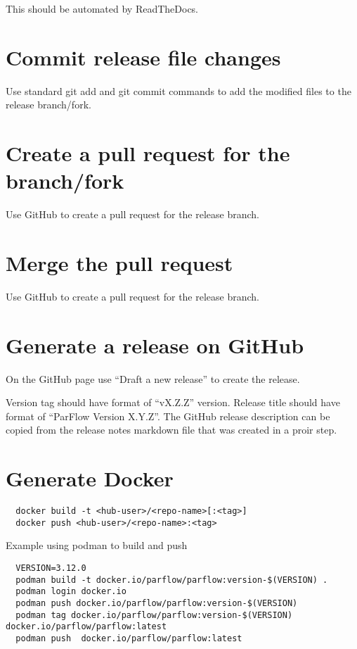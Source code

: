 This should be automated by ReadTheDocs.
  
\section{Commit release file changes}

Use standard git add and git commit commands to add the modified files
to the release branch/fork.

\section{Create a pull request for the branch/fork}

Use GitHub to create a pull request for the release branch.
  
\section{Merge the pull request}

Use GitHub to create a pull request for the release branch.
  
\section{Generate a release on GitHub}

On the GitHub  page use
``Draft a new release'' to create the release.

Version tag should have format of ``vX.Z.Z'' version.  Release title
should have format of ``ParFlow Version X.Y.Z''.  The GitHub release
description can be copied from the release notes markdown file that
was created in a proir step.

\section{Generate Docker}

\begin{display}\begin{verbatim}
  docker build -t <hub-user>/<repo-name>[:<tag>]
  docker push <hub-user>/<repo-name>:<tag>
\end{verbatim}\end{display}

Example using podman to build and push

\begin{display}\begin{verbatim}
  VERSION=3.12.0
  podman build -t docker.io/parflow/parflow:version-$(VERSION) .
  podman login docker.io
  podman push docker.io/parflow/parflow:version-$(VERSION)
  podman tag docker.io/parflow/parflow:version-$(VERSION) docker.io/parflow/parflow:latest
  podman push  docker.io/parflow/parflow:latest
\end{verbatim}\end{display}
  

